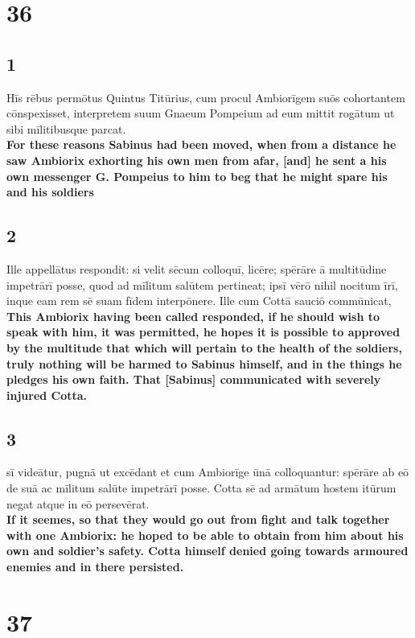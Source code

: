 \documentclass{article}
\begin{document}
\section*{36}
\subsection*{1}
Hīs rēbus permōtus Quintus Titūrius, cum procul Ambiorīgem suōs cohortantem cōnspexisset, interpretem suum Gnaeum Pompeium ad eum mittit rogātum ut sibi mīlitibusque parcat.  \\
\textbf{For these reasons Sabinus had been moved, when from a distance he saw Ambiorix exhorting his own men from afar, [and] he sent a his own messenger G. Pompeius to him to beg that he might spare his and his soldiers}

\subsection*{2}
Ille appellātus respondit: si velit sēcum colloquī, licēre; spērāre ā multitūdine impetrārī posse, quod ad mīlitum salūtem pertineat; ipsī vērō nihil nocitum īrī, inque eam rem sē suam fīdem interpōnere. Ille cum Cottā sauciō commūnicat,  \\
\textbf{This Ambiorix having been called responded, if he should wish to speak with him, it was permitted, he hopes it is possible to approved by the multitude that which will pertain to the health of the soldiers, truly nothing will be harmed to Sabinus himself, and in the things he pledges his own faith. That [Sabinus] communicated with severely injured Cotta.}

\subsection*{3}
sī videātur, pugnā ut excēdant et cum Ambiorīge ūnā colloquantur: spērāre ab eō de suā ac mīlitum salūte impetrārī posse. Cotta sē ad armātum hostem itūrum negat atque in eō persevērat. \\
\textbf{If it seemes, so that they would go out from fight and talk together with one Ambiorix: he hoped to be able to obtain from him about his own and soldier's safety. Cotta himself denied going towards armoured enemies and in there persisted.}


\section*{37}
\end{document}
